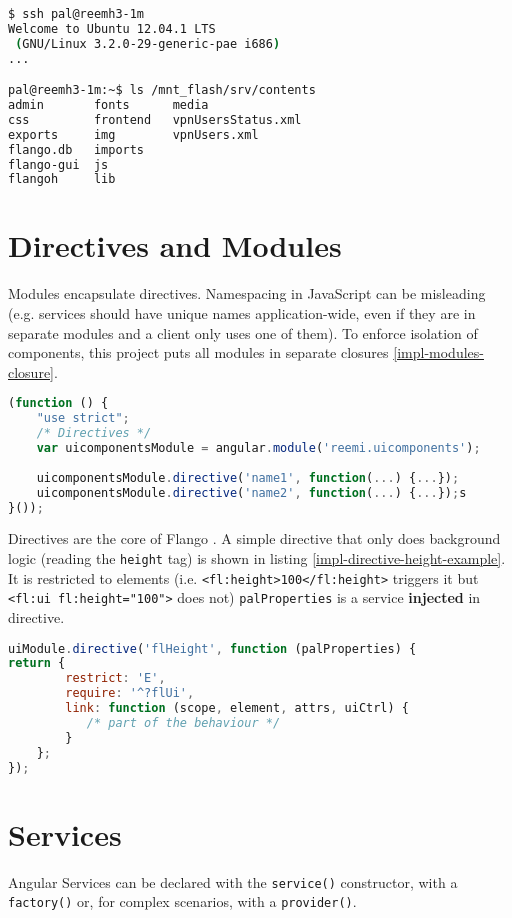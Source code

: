 \begin{lstlisting}[columns=fixed,language=bash,caption=Connection with robots, label=impl-ssh]
$ ssh pal@reemh3-1m
Welcome to Ubuntu 12.04.1 LTS 
 (GNU/Linux 3.2.0-29-generic-pae i686)
...

pal@reemh3-1m:~$ ls /mnt_flash/srv/contents
admin       fonts      media
css         frontend   vpnUsersStatus.xml     
exports     img        vpnUsers.xml
flango.db   imports    
flango-gui  js         
flangoh     lib
\end{lstlisting}

\section{Directives and Modules}
Modules encapsulate directives.
Namespacing in JavaScript can be misleading (e.g. services should have unique names application-wide, even if they are in separate modules and a client only uses one of them).
To enforce isolation of components, this project puts all modules in separate closures \ref{impl-modules-closure}.

\begin{lstlisting}[language=JavaScript, caption=Closures to isolate modules, label=impl-modules-closure]
(function () {
    "use strict";
    /* Directives */
    var uicomponentsModule = angular.module('reemi.uicomponents');
    
    uicomponentsModule.directive('name1', function(...) {...});
    uicomponentsModule.directive('name2', function(...) {...});s
}());
\end{lstlisting}

Directives are the core of Flango \cm .
A simple directive that only does background logic (reading the \texttt{height} tag) is shown in listing \ref{impl-directive-height-example}.
It is restricted to elements (i.e. \lstinline$<fl:height>100</fl:height>$ triggers it but \lstinline$<fl:ui fl:height="100">$ does not)
\texttt{palProperties} is a service \textbf{injected} in directive.

\begin{lstlisting}[language=JavaScript,caption=flHeight Directive, label=impl-directive-height-example]
uiModule.directive('flHeight', function (palProperties) {
return {
        restrict: 'E',
        require: '^?flUi',
        link: function (scope, element, attrs, uiCtrl) {
           /* part of the behaviour */
        }
    };
});
\end{lstlisting}


\section{Services}
Angular Services can be declared with the \texttt{service()} constructor, with a \texttt{factory()} or, for complex scenarios, with a \texttt{provider()}.

